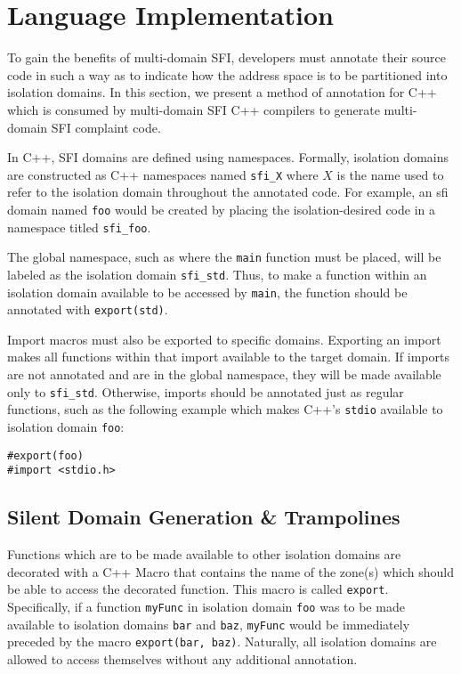 \documentclass[12pt]{article}
\begin{document}
\section{Language Implementation}

To gain the benefits of multi-domain SFI, developers must annotate their source code in such a way as to indicate how the address space is to be partitioned into isolation domains. In this section, we present a method of annotation for C++ which is consumed by multi-domain SFI C++ compilers to generate multi-domain SFI complaint code.

In C++, SFI domains are defined using namespaces. Formally, isolation domains are constructed as C++ namespaces named \texttt{sfi\_X} where $X$ is the name used to refer to the isolation domain throughout the annotated code. For example, an sfi domain named \texttt{foo} would be created by placing the isolation-desired code in a namespace titled \texttt{sfi\_foo}.

The global namespace, such as where the \texttt{main} function must be placed, will be labeled as the isolation domain \texttt{sfi\_std}. Thus, to make a function within an isolation domain available to be accessed by \texttt{main}, the function should be annotated with \texttt{export(std)}.

Import macros must also be exported to specific domains. Exporting an import makes all functions within that import available to the target domain. If imports are not annotated and are in the global namespace, they will be made available only to \texttt{sfi\_std}. Otherwise, imports should be annotated just as regular functions, such as the following example which makes C++'s \texttt{stdio} available to isolation domain \texttt{foo}:
\begin{verbatim}
#export(foo)
#import <stdio.h>
\end{verbatim}

\subsection{Silent Domain Generation \& Trampolines}

Functions which are to be made available to other isolation domains are decorated with a C++ Macro that contains the name of the zone(s) which should be able to access the decorated function. This macro is called \texttt{export}. Specifically, if a function \texttt{myFunc} in isolation domain \texttt{foo} was to be made available to isolation domains \texttt{bar} and \texttt{baz}, \texttt{myFunc} would be immediately preceded by the macro \texttt{export(bar, baz)}. Naturally, all isolation domains are allowed to access themselves without any additional annotation.
\end{document}
